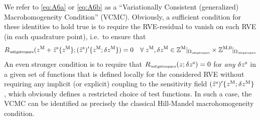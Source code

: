 \documentclass[12pt,a4paper]{article}
\renewcommand{\Box}{\mdlgwhtsquare}
\newcommand{\rve}{
  {\mathchoice
   {\mbox{\scalebox{0.67}{$\Box$}}}
   {\mbox{\scalebox{0.67}{$\Box$}}}
   {\mbox{\scalebox{0.5}{$\Box$}}}
   {\mbox{\scalebox{0.375}{$\Box$}}}
  }
}
\begin{document}
We refer to \cref{eq:A6a} or \cref{eq:A6b} as a ``Variationally Consistent (generalized) Macrohomogeneity Condition'' (VCMC).
Obviously, a sufficient condition for these identities to hold true is to require the RVE-residual to vanish on each RVE (in each quadrature point), i.e.\ to ensure that
\begin{align}
\label{eq:A8} R_\rve(z^\macro + \tilde z^\fluct\{z^\macro\};(\tilde{z}^\fluct)'\{z^\macro;\delta z^\macro\}) = 0\quad \forall\;z^\macro,\delta z^\macro\in\set Z^{\macro}|_{\Omega_\rve}\times\set Z^{\macro,0}|_{\Omega_\rve}
\end{align}
An even stronger condition is to require that $R_\rve(z;\delta z^\fluct) = 0$ for \emph{any} $\delta z^{\mathrm{s}}$ in a given set of functions that is defined locally for the considered RVE without requiring any implicit (or explicit) 
coupling to the sensitivity field $(\tilde{z}^{\mathrm{s}})'\{z^{\mathrm{M}};\delta z^{\mathrm{M}}\}$, which obviously defines a restricted choice of test functions.
In such a case, the VCMC can be identified as precisely the classical Hill-Mandel macrohomogeneity condition.
\end{document}
